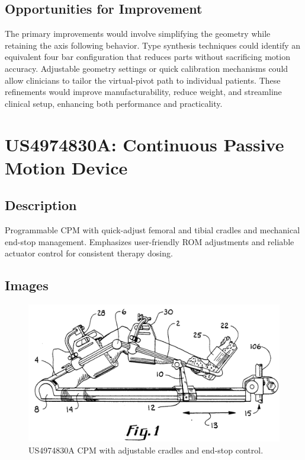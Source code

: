\documentclass[11pt]{article}
\begin{document}
\subsection{Opportunities for Improvement}
The primary improvements would involve simplifying the geometry while retaining the axis following behavior. Type synthesis techniques could identify an equivalent four bar configuration that reduces parts without sacrificing motion accuracy. Adjustable geometry settings or quick calibration mechanisms could allow clinicians to tailor the virtual-pivot path to individual patients. These refinements would improve manufacturability, reduce weight, and streamline clinical setup, enhancing both performance and practicality.

\section{US4974830A: Continuous Passive Motion Device}
\subsection{Description}
Programmable CPM with quick-adjust femoral and tibial cradles and mechanical end-stop management. Emphasizes user-friendly ROM adjustments and reliable actuator control for consistent therapy dosing.
\subsection{Images}
\begin{figure}[H]
  \centering
  \includegraphics[width=0.54\linewidth]{US4974830_1.png}
  \caption{US4974830A CPM with adjustable cradles and end-stop control.}
  \label{fig:US4974830A}
\end{figure}
\end{document}
